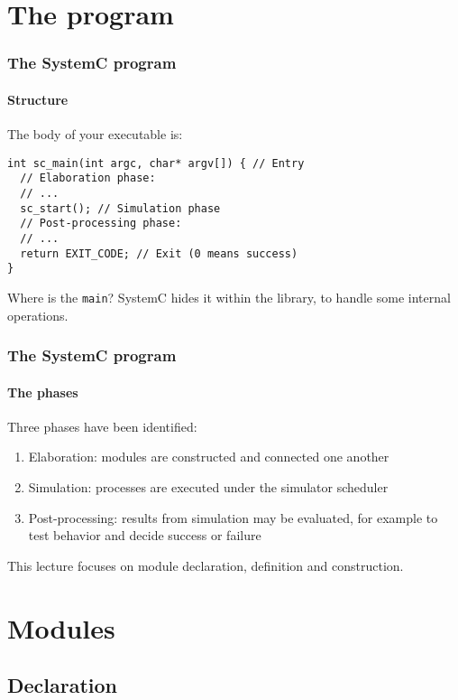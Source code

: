 \section{The program}

\begin{frame}[fragile]
\frametitle{The SystemC program}
\framesubtitle{Structure}

\begin{block}{The body of your executable is:}
\vspace{-1em}
\begin{verbatim}
int sc_main(int argc, char* argv[]) { // Entry
  // Elaboration phase:
  // ...
  sc_start(); // Simulation phase
  // Post-processing phase:
  // ...
  return EXIT_CODE; // Exit (0 means success)
}
\end{verbatim}
\vspace{-1em}
\end{block}
\pause
\begin{block}{Where is the \texttt{main}?}
SystemC hides it within the library, to handle some internal operations.
\end{block}
\end{frame}

\begin{frame}
\frametitle{The SystemC program}
\framesubtitle{The phases}

\begin{block}{Three phases have been identified:}
\begin{enumerate}
\item Elaboration: modules are constructed and connected one another
\item Simulation: processes are executed under the simulator scheduler
\item Post-processing: results from simulation may be evaluated, for example to test behavior and decide success or failure
\end{enumerate}
\end{block}
\pause
This lecture focuses on module declaration, definition and construction.

\end{frame}

\section{Modules}

\subsection{Declaration}

